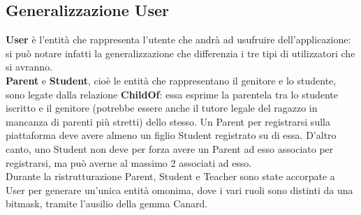 \documentclass[Lau, binding=0.6cm, oneside]{sapthesis}
\begin{document}
\subsection{Generalizzazione User}
\textbf{User} è l'entità che rappresenta l'utente che andrà ad usufruire dell'applicazione: si può notare infatti la generalizzazione che differenzia i tre tipi di utilizzatori che si avranno.\\
\textbf{Parent} e \textbf{Student}, cioè le entità che rappresentano il genitore e lo studente, sono legate dalla relazione \textbf{ChildOf}: essa esprime la parentela tra lo studente iscritto e il genitore (potrebbe essere anche il tutore legale del ragazzo in mancanza di parenti più stretti) dello stesso. Un Parent per registrarsi sulla piattaforma deve avere almeno un figlio Student registrato su di essa. D'altro canto, uno Student non deve per forza avere un Parent ad esso associato per registrarsi, ma può averne al massimo 2 associati ad esso.\\
Durante la ristrutturazione Parent, Student e Teacher sono state accorpate a User per generare un'unica entità omonima, dove i vari ruoli sono distinti da una bitmask, tramite l'ausilio della gemma Canard.
\end{document}
